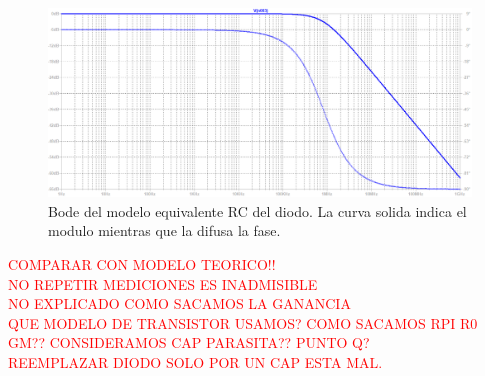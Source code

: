\documentclass[a4paper]{article}
\begin{document}
\begin{figure}[H]
	\centering
	\includegraphics[width=1 \textwidth]{RtaF3RC.png}	
	\caption{Bode del modelo equivalente RC del diodo. La curva solida indica el modulo mientras que la difusa la fase.}
	\label{fig:rcmodel}
\end{figure}



\textcolor{red}{COMPARAR CON MODELO TEORICO!!}\\
\textcolor{red}{NO REPETIR MEDICIONES ES INADMISIBLE}\\
\textcolor{red}{NO EXPLICADO COMO SACAMOS LA GANANCIA}\\
\textcolor{red}{QUE MODELO DE TRANSISTOR USAMOS? COMO SACAMOS RPI R0 GM?? CONSIDERAMOS CAP PARASITA?? PUNTO Q?}\\
\textcolor{red}{REEMPLAZAR DIODO SOLO POR UN CAP ESTA MAL.}\\
\end{document}
